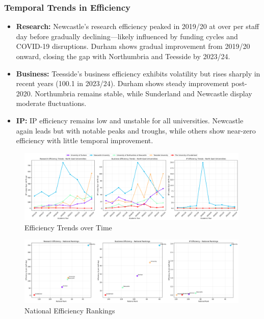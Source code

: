 \documentclass[journal,onecolumn, 10pt,draftclsnofoot]{IEEEtran}
\begin{document}
\subsubsection{Temporal Trends in Efficiency}

\begin{itemize}
    \item \textbf{Research:} Newcastle's research efficiency peaked in 2019/20 at over  per staff day before gradually declining—likely influenced by funding cycles and COVID-19 disruptions. Durham shows gradual improvement from 2019/20 onward, closing the gap with Northumbria and Teesside by 2023/24.
    
    \item \textbf{Business:} Teesside's business efficiency exhibits volatility but rises sharply in recent years (100.1 in 2023/24). Durham shows steady improvement post-2020. Northumbria remains stable, while Sunderland and Newcastle display moderate fluctuations.
    
    \item \textbf{IP:} IP efficiency remains low and unstable for all universities. Newcastle again leads but with notable peaks and troughs, while others show near-zero efficiency with little temporal improvement.
\end{itemize}

\begin{figure}[h]
\centering
\includegraphics[width=0.99\textwidth]{Fig/figure39.efficiency_trends.png}
\caption{Efficiency Trends over Time}
\label{fig:efficiency-trends}
\end{figure}

\begin{figure}[h]
\centering
\includegraphics[width=0.99\textwidth]{Fig/figure40.national_efficiency_rankings.png}
\caption{National Efficiency Rankings}
\label{fig:national-efficiency-rankings}
\end{figure}
\end{document}
